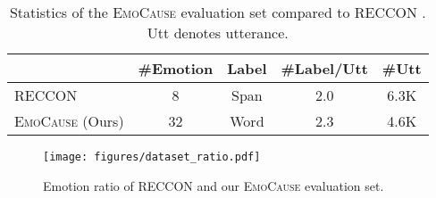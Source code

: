 \documentclass[11pt]{article}
\begin{document}
{\renewcommand{\arraystretch}{1.1}
    \begin{table}[t] \begin{center}
\begin{adjustbox}{width=\columnwidth}
    \begin{tabular}{lcccc}
        \toprule
                                & \#Emotion      & Label     & \#Label/Utt    & \#Utt                 \\
        \midrule
        RECCON                  & 8              & Span      & 2.0             & 6.3K \\
        \textsc{EmoCause} (Ours)     & 32             & Word      & 2.3             & 4.6K \\
        \bottomrule
    \end{tabular}
    \end{adjustbox}
    \vspace{-5pt}
    \caption{
        Statistics of the \textsc{EmoCause} evaluation set compared to RECCON \citep{Poria:2020:arxiv}. Utt denotes utterance.
    }
    \vspace{-15pt}
    \label{tab:dataset_stats}
\end{center}\end{table}}

\begin{figure}[t] \begin{center}
    \texttt{[image: figures/dataset\_ratio.pdf]}
    \vspace{-17pt}
    \caption{Emotion ratio of RECCON and our \textsc{EmoCause} evaluation set.}
    \label{fig:label_ratio}
    \vspace{-12pt}
\end{center} \end{figure}
\end{document}
